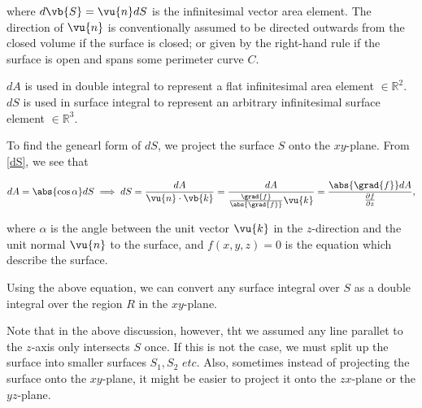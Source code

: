 \documentclass[english,a4paper,12pt]{report}
\begin{document}
where \(d\vb{S} = \vu{n} dS\) is the infinitesimal vector area element. The direction of \(\vu{n} \) is conventionally assumed to be directed outwards from the closed volume if the surface is closed; or given by the right-hand rule if the surface is open and spans some perimeter curve \(C\). 

\(dA\) is used in double integral to represent a flat infinitesimal area element \(\in \mathbb{R}^2\). \(dS\) is used in surface integral to represent an arbitrary infinitesimal surface element \(\in \mathbb{R}^3 \).

To find the genearl form of \(dS\), we project the surface \(S\) onto the \(xy\)-plane. From \cref{dS}, we see that 

\begin{equation} \label{dseq} 
	dA = \abs{\cos \alpha }dS \implies dS = \frac{dA}{\vu{n} \cdot \vb{k} } = \frac{dA}{\frac{\grad{f} }{\abs{\grad{f} } } \vu{k}  } =  \frac{\abs{\grad{f}}dA }{\frac{\partial f}{\partial z} }, 
\end{equation}

where \(\alpha \) is the angle between the unit vector \(\vu{k} \) in the \(z\)-direction and the unit normal \(\vu{n} \) to the surface, and \(f(x,y,z)=0\) is the equation which describe the surface. 


Using the above equation, we can convert any surface integral over \(S\) as a double integral over the region \(R\) in the \(xy\)-plane.

Note that in the above discussion, however, tht we assumed any line parallet to the \(z\)-axis only intersects \(S\) once. If this is not the case, we must split up the surface into smaller surfaces \(S_1, S_2 \textit{ etc.}\) Also, sometimes instead of projecting the surface onto the \(xy\)-plane, it might be easier to project it onto the \(zx\)-plane or the \(yz\)-plane.     
\end{document}
